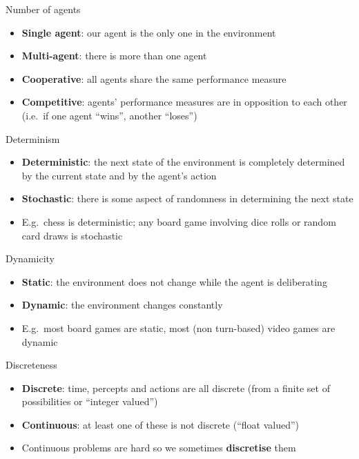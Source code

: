\begin{frame}{Number of agents}
    \begin{itemize}
        \pause\item \textbf{Single agent}: our agent is the only one in the environment
        \pause\item \textbf{Multi-agent}: there is more than one agent
        \pause\item \textbf{Cooperative}: all agents share the same performance measure
        \pause\item \textbf{Competitive}: agents' performance measures are in opposition to each other
            (i.e.\ if one agent ``wins'', another ``loses'')
    \end{itemize}
\end{frame}

\begin{frame}{Determinism}
    \begin{itemize}
        \pause\item \textbf{Deterministic}: the next state of the environment is completely determined by the current state and by the agent's action
        \pause\item \textbf{Stochastic}: there is some aspect of randomness in determining the next state
        \pause\item E.g.\ chess is deterministic; any board game involving dice rolls or random card draws is stochastic
    \end{itemize}
\end{frame}

\begin{frame}{Dynamicity}
    \begin{itemize}
        \pause\item \textbf{Static}: the environment does not change while the agent is deliberating
        \pause\item \textbf{Dynamic}: the environment changes constantly
        \pause\item E.g.\ most board games are static, most (non turn-based) video games are dynamic
    \end{itemize}
\end{frame}

\begin{frame}{Discreteness}
    \begin{itemize}
        \pause\item \textbf{Discrete}: time, percepts and actions are all discrete
            (from a finite set of possibilities or ``integer valued'')
        \pause\item \textbf{Continuous}: at least one of these is not discrete
            (``float valued'')
        \pause\item Continuous problems are hard so we sometimes \textbf{discretise} them
    \end{itemize}
\end{frame}

